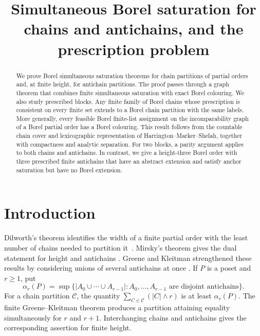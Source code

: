 \documentclass[11pt,reqno]{amsart}
\theoremstyle{plain}
\theoremstyle{definition}
\theoremstyle{remark}
\begin{document}
\title[Simultaneous Borel saturation]{Simultaneous Borel saturation for chains
and antichains, and the prescription problem}



\begin{abstract}
We prove Borel simultaneous saturation theorems for chain partitions of
partial orders and, at finite height, for antichain partitions. The proof
passes through a graph theorem that combines finite simultaneous saturation
with exact Borel colouring. We also study prescribed blocks. Any finite
family of Borel chains whose prescription is consistent on every finite set
extends to a Borel chain partition with the same labels. More generally,
every feasible Borel finite-list assignment on the incomparability graph of
a Borel partial order has a Borel colouring. This result follows from the
countable chain cover and lexicographic representation of
Harrington--Marker--Shelah, together with compactness and analytic
separation. For two blocks, a parity argument applies to both chains and
antichains. In contrast, we give a height-three Borel order with three
prescribed finite antichains that have an abstract extension and satisfy
anchor saturation but have no Borel extension.
\end{abstract}

\maketitle

\section{Introduction}
\label{sec:intro}

Dilworth's theorem identifies the width of a finite partial order with
the least number of chains needed to partition it~\cite{Dilworth1950}.
Mirsky's theorem gives the dual statement for height and antichains
\cite{Mirsky1971}. Greene and Kleitman strengthened these results by
considering unions of several antichains at once
\cite{GreeneKleitman1976}. If $P$ is a poset and $r\ge1$, put
\[
\alpha_r(P)=\sup\bigl\{|A_0\cup\cdots\cup A_{r-1}|:
 A_0,\ldots,A_{r-1}\text{ are disjoint antichains}\bigr\}.
\]
For a chain partition $\mathcal C$, the quantity
$\sum_{C\in\mathcal C}(|C|\wedge r)$ is at least $\alpha_r(P)$.
The finite Greene--Kleitman theorem produces a partition attaining
equality simultaneously for $r$ and $r+1$. Interchanging chains and
antichains gives the corresponding assertion for finite height.
\end{document}
